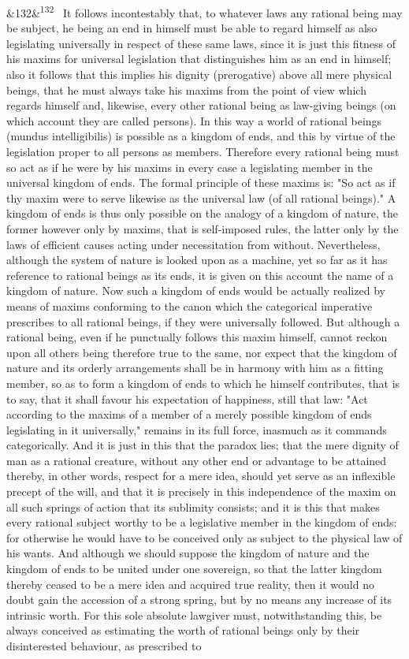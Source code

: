 \documentclass[12pt]{article}
\newcommand{\para}[1][]{\par\noindent\ifx&#1&\else\textsuperscript{\footnotesize #1}~\fi}
\begin{document}
\para[132] It follows incontestably that, to whatever laws any rational being may be subject, he being an end in himself must be able to regard himself as also legislating universally in respect of these same laws, since it is just this fitness of his maxims for universal legislation that distinguishes him as an end in himself; also it follows that this implies his dignity (prerogative) above all mere physical beings, that he must always take his maxims from the point of view which regards himself and, likewise, every other rational being as law-giving beings (on which account they are called persons). In this way a world of rational beings (mundus intelligibilis) is possible as a kingdom of ends, and this by virtue of the legislation proper to all persons as members. Therefore every rational being must so act as if he were by his maxims in every case a legislating member in the universal kingdom of ends. The formal principle of these maxims is: "So act as if thy maxim were to serve likewise as the universal law (of all rational beings)." A kingdom of ends is thus only possible on the analogy of a kingdom of nature, the former however only by maxims, that is self-imposed rules, the latter only by the laws of efficient causes acting under necessitation from without. Nevertheless, although the system of nature is looked upon as a machine, yet so far as it has reference to rational beings as its ends, it is given on this account the name of a kingdom of nature. Now such a kingdom of ends would be actually realized by means of maxims conforming to the canon which the categorical imperative prescribes to all rational beings, if they were universally followed. But although a rational being, even if he punctually follows this maxim himself, cannot reckon upon all others being therefore true to the same, nor expect that the kingdom of nature and its orderly arrangements shall be in harmony with him as a fitting member, so as to form a kingdom of ends to which he himself contributes, that is to say, that it shall favour his expectation of happiness, still that law: "Act according to the maxims of a member of a merely possible kingdom of ends legislating in it universally," remains in its full force, inasmuch as it commands categorically. And it is just in this that the paradox lies; that the mere dignity of man as a rational creature, without any other end or advantage to be attained thereby, in other words, respect for a mere idea, should yet serve as an inflexible precept of the will, and that it is precisely in this independence of the maxim on all such springs of action that its sublimity consists; and it is this that makes every rational subject worthy to be a legislative member in the kingdom of ends: for otherwise he would have to be conceived only as subject to the physical law of his wants. And although we should suppose the kingdom of nature and the kingdom of ends to be united under one sovereign, so that the latter kingdom thereby ceased to be a mere idea and acquired true reality, then it would no doubt gain the accession of a strong spring, but by no means any increase of its intrinsic worth. For this sole absolute lawgiver must, notwithstanding this, be always conceived as estimating the worth of rational beings only by their disinterested behaviour, as prescribed to 
\end{document}

